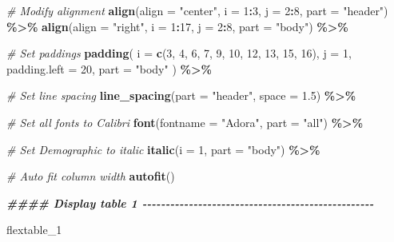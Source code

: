 \documentclass[
]{article}
\newenvironment{Shaded}{\begin{snugshade}}{\end{snugshade}}
\newcommand{\AttributeTok}[1]{\textcolor[rgb]{0.13,0.29,0.53}{#1}}
\newcommand{\CommentTok}[1]{\textcolor[rgb]{0.56,0.35,0.01}{\textit{#1}}}
\newcommand{\DecValTok}[1]{\textcolor[rgb]{0.00,0.00,0.81}{#1}}
\newcommand{\DocumentationTok}[1]{\textcolor[rgb]{0.56,0.35,0.01}{\textbf{\textit{#1}}}}
\newcommand{\FloatTok}[1]{\textcolor[rgb]{0.00,0.00,0.81}{#1}}
\newcommand{\FunctionTok}[1]{\textcolor[rgb]{0.13,0.29,0.53}{\textbf{#1}}}
\newcommand{\NormalTok}[1]{#1}
\newcommand{\SpecialCharTok}[1]{\textcolor[rgb]{0.81,0.36,0.00}{\textbf{#1}}}
\newcommand{\StringTok}[1]{\textcolor[rgb]{0.31,0.60,0.02}{#1}}
\begin{document}
\begin{Shaded}
\begin{Highlighting}[]
  \CommentTok{\# Modify alignment}
  \FunctionTok{align}\NormalTok{(}\AttributeTok{align =} \StringTok{"center"}\NormalTok{, }\AttributeTok{i =} \DecValTok{1}\SpecialCharTok{:}\DecValTok{3}\NormalTok{, }\AttributeTok{j =} \DecValTok{2}\SpecialCharTok{:}\DecValTok{8}\NormalTok{, }\AttributeTok{part =} \StringTok{"header"}\NormalTok{) }\SpecialCharTok{\%\textgreater{}\%}
  \FunctionTok{align}\NormalTok{(}\AttributeTok{align =} \StringTok{"right"}\NormalTok{, }\AttributeTok{i =} \DecValTok{1}\SpecialCharTok{:}\DecValTok{17}\NormalTok{, }\AttributeTok{j =} \DecValTok{2}\SpecialCharTok{:}\DecValTok{8}\NormalTok{, }\AttributeTok{part =} \StringTok{"body"}\NormalTok{) }\SpecialCharTok{\%\textgreater{}\%}
  
  \CommentTok{\# Set paddings}
  \FunctionTok{padding}\NormalTok{(}
    \AttributeTok{i =} \FunctionTok{c}\NormalTok{(}\DecValTok{3}\NormalTok{, }\DecValTok{4}\NormalTok{, }\DecValTok{6}\NormalTok{, }\DecValTok{7}\NormalTok{, }\DecValTok{9}\NormalTok{, }\DecValTok{10}\NormalTok{, }\DecValTok{12}\NormalTok{, }\DecValTok{13}\NormalTok{, }\DecValTok{15}\NormalTok{, }\DecValTok{16}\NormalTok{),}
    \AttributeTok{j =} \DecValTok{1}\NormalTok{,}
    \AttributeTok{padding.left =} \DecValTok{20}\NormalTok{,}
    \AttributeTok{part =} \StringTok{"body"}
\NormalTok{  ) }\SpecialCharTok{\%\textgreater{}\%}
  
  \CommentTok{\# Set line spacing}
  \FunctionTok{line\_spacing}\NormalTok{(}\AttributeTok{part =} \StringTok{"header"}\NormalTok{, }\AttributeTok{space =} \FloatTok{1.5}\NormalTok{) }\SpecialCharTok{\%\textgreater{}\%}
  
  \CommentTok{\# Set all fonts to \textquotesingle{}Calibri\textquotesingle{}}
  \FunctionTok{font}\NormalTok{(}\AttributeTok{fontname =} \StringTok{"Adora"}\NormalTok{, }\AttributeTok{part =} \StringTok{"all"}\NormalTok{) }\SpecialCharTok{\%\textgreater{}\%}
  
  \CommentTok{\# Set \textquotesingle{}Demographic\textquotesingle{} to italic}
  \FunctionTok{italic}\NormalTok{(}\AttributeTok{i =} \DecValTok{1}\NormalTok{, }\AttributeTok{part =} \StringTok{"body"}\NormalTok{) }\SpecialCharTok{\%\textgreater{}\%}
  
  \CommentTok{\# Auto fit column width}
  \FunctionTok{autofit}\NormalTok{()}




\DocumentationTok{\#\#\#\# Display table 1  {-}{-}{-}{-}{-}{-}{-}{-}{-}{-}{-}{-}{-}{-}{-}{-}{-}{-}{-}{-}{-}{-}{-}{-}{-}{-}{-}{-}{-}{-}{-}{-}{-}{-}{-}{-}{-}{-}{-}{-}{-}{-}{-}{-}{-}{-}{-}{-}{-}{-}}

\NormalTok{flextable\_1}
\end{Highlighting}
\end{Shaded}
\end{document}
